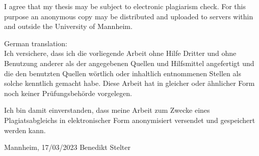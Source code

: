 \documentclass{scrbook}
\begin{document}
\noindent I agree that my thesis may be subject to electronic plagiarism check. For this purpose an anonymous copy may be distributed and uploaded to
servers within and outside the University of Mannheim.

\vspace{2\baselineskip}

\noindent German translation:\\
Ich versichere, dass ich die vorliegende Arbeit ohne Hilfe Dritter und ohne Benutzung anderer
als der angegebenen Quellen und Hilfsmittel angefertigt und die den benutzten Quellen
wörtlich oder inhaltlich entnommenen Stellen als solche kenntlich gemacht habe. Diese Arbeit
hat in gleicher oder ähnlicher Form noch keiner Prüfungsbehörde vorgelegen.

\noindent Ich bin damit einverstanden, dass meine Arbeit zum Zwecke eines Plagiatsabgleichs in
elektronischer Form anonymisiert versendet und gespeichert werden kann.

\vspace{4\baselineskip}
\begin{center}
\parbox{.8\textwidth}{Mannheim, 17/03/2023 \hfill Benedikt Stelter}
\end{center}


 
\end{document}
